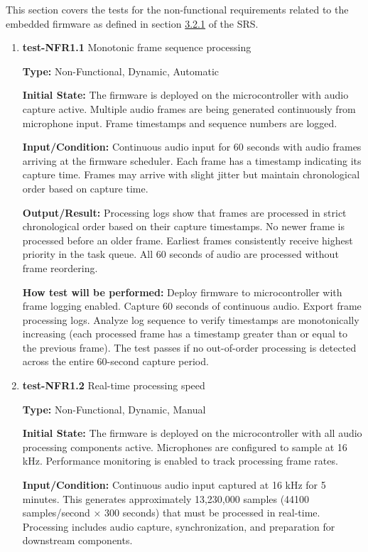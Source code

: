 \documentclass[12pt, titlepage]{article}
\begin{document}
This section covers the tests for the non-functional requirements related to the 
embedded firmware as defined in section \hyperref[SRS-sec:FR1]{3.2.1} of the SRS.

\begin{enumerate}

\item{\textbf{test-NFR1.1} Monotonic frame sequence processing\\}

\textbf{Type:} Non-Functional, Dynamic, Automatic
					
\textbf{Initial State:} 
The firmware is deployed on the microcontroller with audio capture active. 
Multiple audio frames are being generated continuously from microphone input. 
Frame timestamps and sequence numbers are logged.
					
\textbf{Input/Condition:} 
Continuous audio input for 60 seconds with audio frames arriving at the firmware 
scheduler. Each frame has a timestamp indicating its capture time. Frames may 
arrive with slight jitter but maintain chronological order based on capture time.
					
\textbf{Output/Result:} 
Processing logs show that frames are processed in strict chronological order 
based on their capture timestamps. No newer frame is processed before an older 
frame. Earliest frames consistently receive highest priority in the task queue. 
All 60 seconds of audio are processed without frame reordering.
					
\textbf{How test will be performed:} 
Deploy firmware to microcontroller with frame logging enabled. Capture 60 seconds 
of continuous audio. Export frame processing logs. Analyze log sequence to verify 
timestamps are monotonically increasing (each processed frame has a timestamp 
greater than or equal to the previous frame). The test passes if no out-of-order 
processing is detected across the entire 60-second capture period.
					
\item{\textbf{test-NFR1.2} Real-time processing speed\\}

\textbf{Type:} Non-Functional, Dynamic, Manual
					
\textbf{Initial State:} 
The firmware is deployed on the microcontroller with all audio processing 
components active. Microphones are configured to sample at 16 kHz. Performance 
monitoring is enabled to track processing frame rates.
					
\textbf{Input/Condition:} 
Continuous audio input captured at 16 kHz for 5 minutes. This generates 
approximately 13,230,000 samples (44100 samples/second × 300 seconds) that must 
be processed in real-time. Processing includes audio capture, synchronization, 
and preparation for downstream components.
					

\end{enumerate}
\end{document}
